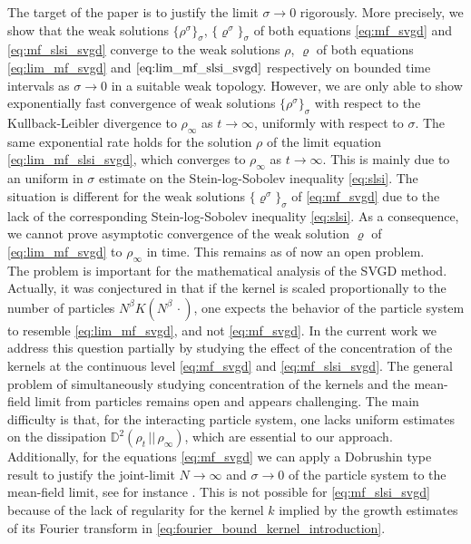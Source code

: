 \documentclass[reqno, 11pt]{amsart}
\numberwithin{equation}{section}
\theoremstyle{definition}
\begin{document}
    The target of the paper is to justify the limit $\sigma \to 0$ rigorously. More precisely, we show that the weak solutions $\{\rho^\sigma\}_\sigma$, $\{\varrho^\sigma\}_\sigma$ of both equations \eqref{eq:mf_svgd} and
    \eqref{eq:mf_slsi_svgd} converge to the weak solutions $\rho$, $\varrho$ of both equations \eqref{eq:lim_mf_svgd} and $\eqref{eq:lim_mf_slsi_svgd}$ respectively on bounded time intervals as $\sigma\to 0$ in a suitable weak topology. However, we are only able to show
    exponentially fast convergence of weak solutions $\{\rho^\sigma\}_\sigma$ with respect to the Kullback-Leibler divergence to $\rho_\infty$ as $t\to\infty$, uniformly with respect to $\sigma$. The same exponential rate holds for the solution $\rho$ of the limit equation \eqref{eq:lim_mf_slsi_svgd}, which converges to $\rho_\infty$ as $t\to\infty$. This is mainly due to an uniform in $\sigma$ estimate on the Stein-log-Sobolev inequality \eqref{eq:slsi}. The situation is different for the weak solutions $\{\varrho^\sigma\}_\sigma$ of \eqref{eq:mf_svgd} due to the lack of the corresponding Stein-log-Sobolev inequality \eqref{eq:slsi}. As a consequence, we cannot prove asymptotic convergence of the weak solution $\varrho$ of \eqref{eq:lim_mf_svgd} to $\rho_\infty$ in time. This remains as of now an open problem.\\
    
    The problem is important for the mathematical analysis of the SVGD method. Actually, it was conjectured in \cite[Equation 9]{lu_lu_nolen_2019_scaling} that if the kernel is scaled proportionally to the number of particles $N^\beta K(N^\beta\,\cdot)$, one expects the behavior of the particle system to resemble \eqref{eq:lim_mf_svgd}, and not \eqref{eq:mf_svgd}. In the current work we address this question partially by studying the effect of the concentration of the kernels at the continuous level \eqref{eq:mf_svgd} and \eqref{eq:mf_slsi_svgd}. The general problem of simultaneously studying concentration of the kernels and the mean-field limit from particles remains open and appears challenging. The main difficulty is that, for the interacting particle system, one lacks uniform estimates on the dissipation $\mathbb{D}^2(\rho_t \,||\, \rho_\infty)$, which are essential to our approach. Additionally, for the equations \eqref{eq:mf_svgd} we can apply a Dobrushin type result to justify the joint-limit $N\rightarrow\infty$ and $\sigma\to 0$ of the particle system to the mean-field limit, see for instance \cite[Theorem 1.1]{carrillo_skrzeczkowski_2023_convergence}. This is not possible for \eqref{eq:mf_slsi_svgd} because of the lack of regularity for the kernel $k$ implied by the growth estimates of its Fourier transform in  \eqref{eq:fourier_bound_kernel_introduction}. \\
    
\end{document}
